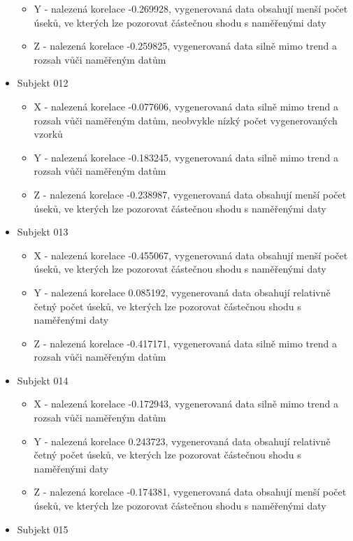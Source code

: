 \documentclass[12pt, a4paper]{article}
\begin{document}
\begin{itemize}
\begin{itemize}
        \item Y - nalezená korelace -0.269928, vygenerovaná data obsahují menší počet úseků, ve kterých lze pozorovat částečnou shodu s naměřenými daty 
        \item Z - nalezená korelace -0.259825, vygenerovaná data silně mimo trend a rozsah vůči naměřeným datům  
      \end{itemize}
  \item Subjekt 012
      \begin{itemize}
        \item X - nalezená korelace -0.077606, vygenerovaná data silně mimo trend a rozsah vůči naměřeným datům, neobvykle nízký počet vygenerovaných vzorků
        \item Y - nalezená korelace -0.183245, vygenerovaná data silně mimo trend a rozsah vůči naměřeným datům 
        \item Z - nalezená korelace -0.238987, vygenerovaná data obsahují menší počet úseků, ve kterých lze pozorovat částečnou shodu s naměřenými daty 
      \end{itemize}
  \item Subjekt 013
      \begin{itemize}
        \item X - nalezená korelace -0.455067, vygenerovaná data obsahují menší počet úseků, ve kterých lze pozorovat částečnou shodu s naměřenými daty 
        \item Y - nalezená korelace 0.085192, vygenerovaná data obsahují relativně četný počet úseků, ve kterých lze pozorovat částečnou shodu s naměřenými daty 
        \item Z - nalezená korelace -0.417171, vygenerovaná data silně mimo trend a rozsah vůči naměřeným datům  
      \end{itemize}
  \item Subjekt 014
      \begin{itemize}
        \item X - nalezená korelace -0.172943, vygenerovaná data silně mimo trend a rozsah vůči naměřeným datům  
        \item Y - nalezená korelace 0.243723, vygenerovaná data obsahují relativně četný počet úseků, ve kterých lze pozorovat částečnou shodu s naměřenými daty 
        \item Z - nalezená korelace -0.174381, vygenerovaná data obsahují menší počet úseků, ve kterých lze pozorovat částečnou shodu s naměřenými daty 
      \end{itemize}
  \item Subjekt 015

\end{itemize}
\end{document}
